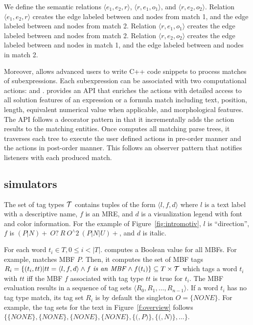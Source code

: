 We define the semantic relations $\langle e_1, e_2, r\rangle$, $\langle r, e_1, o_1\rangle$, and $\langle r,e_2,o_2\rangle$.
Relation $\langle e_1,e_2,r\rangle$ creates the 
edge labeled  between  and 
 nodes from match 1, and the 
edge labeled  between  and  nodes from match 2.
Relation $\langle r,e_1,o_1\rangle$ creates the edge labeled  
between  and  nodes from match 2. 
Relation $\langle r,e_2,o_2\rangle$ creates the edge labeled  
between  and  nodes in 
match 1, and the 
edge labeled  between  and  
nodes in match 2.


Moreover, \framework allows advanced users to write C++ code snippets 
to process matches of subexpressions.
Each subexpression can be associated with two computational 
actions:  and .
%
\framework provides an API that enriches the actions with detailed access to
all solution features of an expression or a formula match including 
text, position, length, equivalent numerical value when applicable, 
and morphological features.
The API follows a decorator pattern in that it incrementally adds the 
action results to the matching entities.
Once \framework computes all matching parse trees, it traverses each tree to 
execute the user defined  actions in pre-order manner
and the  actions in post-order manner.
This follows an observer pattern that notifies listeners with each
produced match.

\vspace{-1em}
\subsection{\framework simulators}

The set of tag types ${\cal T}$ contains tuples of the form $\langle l,f,d\rangle$ 
where $l$ is a text label with a descriptive name, 
$f$ is an MRE, and $d$ is a visualization legend 
with font and color information.
For the example of Figure~\ref{fig:intromotiv},
$l$ is ``direction'',
$f$ is $(P|N)\!+~O?~R~O^\wedge 2~(P|N|U)+$,
and $d$ is italic.

For each word $t_i\in T, 0\le i < |T|$.
\framework computes a Boolean value for all MBFs.
For example,  matches MBF $P$.
Then, it computes the set of MBF tags
$R_i=\{(t_i,tt)| tt=\langle l,f,d\rangle \wedge
f~\mathit{is~an~MBF} \wedge f(t_i)\} \subseteq T \times {\cal T}$
which tags a word $t_i$ with $\mathit{tt}$ 
iff the MBF $f$ associated with
tag type $\mathit{tt}$ is true for $t_i$. 
The MBF evaluation results in a sequence of tag sets 
$\langle R_0, R_1, \ldots, R_{n-1}\rangle$.
If a word $t_i$ has no tag type match, 
its tag set $R_i$ is by default the singleton $O=\{\mathit{NONE}\}$.
For example, the tag sets for the text in Figure~\ref{f:overview} follows 
$\{ \{NONE\}, \{NONE\}, \{NONE\}, \{NONE\}, \{($$,P)\}, \{($$,N)\},\ldots\}$.


